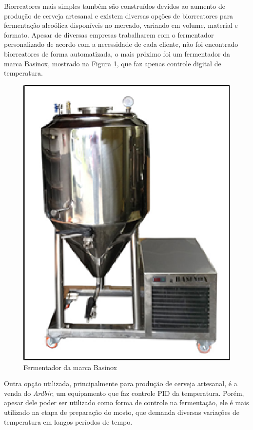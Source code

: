 Biorreatores mais simples também são construídos devidos ao aumento de produção de cerveja artesanal e existem diversas opções de biorreatores para fermentação alcoólica disponíveis no mercado, variando em volume, material e formato. Apesar de diversas empresas trabalharem com o fermentador personalizado de acordo com a necessidade de cada cliente, não foi encontrado biorreatores de forma automatizada, o mais próximo foi um fermentador da marca Basinox, mostrado na Figura \ref{basinox}, que faz apenas controle digital de temperatura.

\begin{figure}[h]
	\centering
	\includegraphics[keepaspectratio=true,scale=0.8]{figuras/basinox.eps}
	\caption{Fermentador da marca Basinox}
	\label{basinox}
\end{figure}

Outra opção utilizada, principalmente para produção de cerveja
artesanal, é a venda do \textit{Ardbir}, um equipamento que faz controle PID da
temperatura. Porém, apesar dele poder ser utilizado como forma de controle na
fermentação, ele é mais utilizado na etapa de preparação do mosto, que demanda
diversas variações de temperatura em longos períodos de tempo.

